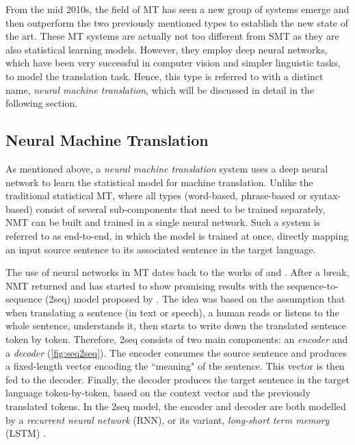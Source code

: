 From the mid 2010s, the field of MT has seen a new group of systems emerge and then outperform the two previously mentioned types to establish the new state of the art.
These MT systems are actually not too different from SMT as they are also statistical learning models.
However, they employ deep neural networks, which have been very successful in computer vision and simpler linguistic tasks, to model the translation task.
Hence, this type is referred to with a distinct name, \textit{neural machine translation}, which will be discussed in detail in the following section.

\subsection{Neural Machine Translation}
\label{the-mt-nmt}
As mentioned above, a \textit{neural machine translation} system uses a deep neural network to learn the statistical model for machine translation.
Unlike the traditional statistical MT, where all types (word-based, phrase-based or syntax-based) consist of several sub-components that need to be trained separately, NMT can be built and trained in a single neural network.
Such a system is referred to as end-to-end, in which the model is trained at once, directly mapping an input source sentence to its associated sentence in the target language.

The use of neural networks in MT dates back to the works of \cite{Castano97machinetranslation} and \cite{neco1997asynchronous}.
After a break, NMT returned and has started to show promising results with the sequence-to-sequence (\seq2seq) model proposed by \cite{DBLP:conf/nips/SutskeverVL14}.
The idea was based on the assumption that when translating a sentence (in text or speech), a human reads or listens to the whole sentence, understands it, then starts to write down the translated sentence token by token.
Therefore, \seq2seq consists of two main components: an \textit{encoder} and a \textit{decoder} (\cref{fig:seq2seq}).
The encoder consumes the source sentence and produces a fixed-length vector encoding the ``meaning" of the sentence.
This vector is then fed to the decoder.
Finally, the decoder produces the target sentence in the target language token-by-token, based on the context vector and the previously translated tokens. 
In the \seq2seq model, the encoder and decoder are both modelled by a \textit{recurrent neural network} (RNN), or its variant, \textit{long-short term memory} (LSTM) \citep{Hochreiter95longshort-term}.

